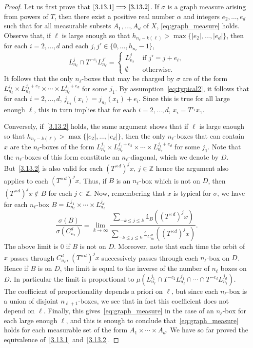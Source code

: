 \documentclass[AHL,Unicode,longabstracts]{cedram}
\newcommand{\ind}[1]{\mathds{1}_{#1}}
\newcommand{\ZZ}{\mathbb{Z}}
\newcommand{\cd}{C^{d}}
\newcommand{\td}{T^{\times d}}
\begin{document}
\begin{proof}
Let us first prove that $\eqref{3.13.1}\Longrightarrow\eqref{3.13.2}$. If $\sigma$ is a graph measure arising from powers of $T$, then there exist a positive real number $\alpha$ and integers $e_2,\ldots,e_d$ such that for all measurable subsets $A_1,\ldots,A_d$ of $X$, \eqref{eq:graph_measure} holds. Observe that, if $\ell$ is large enough so that $h_{n_\ell - k(\ell)} > \max\{|e_2|,\ldots,|e_d|\}$, then for each $i=2,\ldots,d$ and each $j,j'\in\{0,\ldots,h_{n_\ell}-1\}$,
\[
L_{n_\ell}^j \cap T^{-e_i}L_{n_\ell}^{j'}=
\begin{cases}
L_{n_\ell}^j &\text{ if }j'=j+e_i,\\
\emptyset &\text{ otherwise}.
\end{cases}
\]
It follows that the only $n_\ell$-boxes that may be charged by $\sigma$ are of the form $L_{n_\ell}^{j_1}\times L_{n_\ell}^{j_1+e_2}\times \cdots \times L_{n_\ell}^{j_1+e_d}$ for some $j_1$. By assumption~\eqref{eq:typical2}, it follows that for each $i=2,\ldots,d$, $j_{n_\ell}(x_i)= j_{n_\ell}(x_1)+e_i$. Since this is true for all large enough $\ell$, this in turn implies that for each $i=2,\ldots,d$, $x_i=T^{e_i}x_1$.

Conversely, if~\eqref{3.13.2} holds, the same argument shows that if $\ell$ is large enough so that $h_{n_\ell - k(\ell)} > \max\{|e_2|,\ldots,|e_d|\}$, then the only $n_\ell$-boxes that can contain $x$ are the $n_\ell$-boxes of the form $L_{n_\ell}^{j_1}\times L_{n_\ell}^{j_1+e_2}\times \cdots \times L_{n_\ell}^{j_1+e_d}$ for some $j_1$. Note that the $n_\ell$-boxes of this form constitute an $n_\ell$-diagonal, which we denote by $D$. But~\eqref{3.13.2} is also valid for each $(\td)^jx$, $j\in\ZZ$ hence the argument also applies to each $(\td)^jx$. Thus, if $B$ is an $n_\ell$-box which is not on $D$, then $(\td)^jx\notin B$ for each $j\in\ZZ$. Now, remembering that $x$ is typical for $\sigma$, we have for each $n_\ell$-box $B=L_{n_\ell}^{j_1}\times\cdots\times L_{n_\ell}^{j_d}$
\[
\dfrac{\sigma(B)}{\sigma(\cd_{n_\ell})} = \lim_{k\to\infty} \dfrac{\sum_{-k\le j\le k}\ind{B}((\td)^jx)}{\sum_{-k\le j\le k}\ind{\cd_{n_\ell}}((\td)^jx)}.
\]
The above limit is 0 if $B$ is not on $D$. Moreover, note that each time the orbit of $x$ passes through $\cd_{n_\ell}$, $(\td)^jx$ successively passes through each $n_\ell$-box on $D$. Hence if $B$ is on $D$, the limit is equal to the inverse of the number of $n_\ell$ boxes on $D$. In particular the limit is proportional to $\mu\left(L_{n_\ell}^{j_1}\cap T^{-e_2}L_{n_\ell}^{j_1}\cap\cdots\cap T^{-e_d}L_{n_\ell}^{j_d}\right)$. The coefficient of proportionality depends a priori on $\ell$, but since each $n_\ell$-box is a union of disjoint $n_{\ell+1}$-boxes, we see that in fact this coefficient does not depend on $\ell$. Finally, this gives~\eqref{eq:graph_measure} in the case of an $n_\ell$-box for each large enough $\ell$, and this is enough to conclude that~\eqref{eq:graph_measure} holds for each measurable set of the form $A_1\times\cdots\times A_d$. We have so far proved the equivalence of~\eqref{3.13.1} and~\eqref{3.13.2}.


\end{proof}
\end{document}
